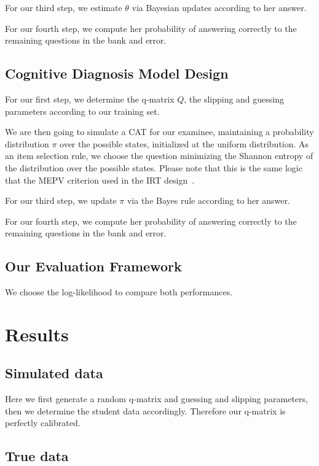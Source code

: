 \documentclass{sig-alternate}
\begin{document}
For our third step, we estimate $\theta$ via Bayesian updates according to her answer.

For our fourth step, we compute her probability of answering correctly to the remaining questions in the bank and error.

\subsection{Cognitive Diagnosis Model Design}

For our first step, we determine the q-matrix $Q$, the slipping and guessing parameters according to our training set.

We are then going to simulate a CAT for our examinee, maintaining a probability distribution $\pi$ over the possible states, initialized at the uniform distribution. As an item selection rule, we choose the question minimizing the Shannon entropy of the distribution over the possible states. Please note that this is the same logic that the MEPV criterion used in the IRT design~\cite{Cheng2009}.

For our third step, we update $\pi$ via the Bayes rule according to her answer.

For our fourth step, we compute her probability of answering correctly to the remaining questions in the bank and error.

\subsection{Our Evaluation Framework}

We choose the log-likelihood to compare both performances.

\section{Results}

\subsection{Simulated data}

Here we first generate a random q-matrix and guessing and slipping parameters, then we determine the student data accordingly. Therefore our q-matrix is perfectly calibrated.

\subsection{True data}
\end{document}

